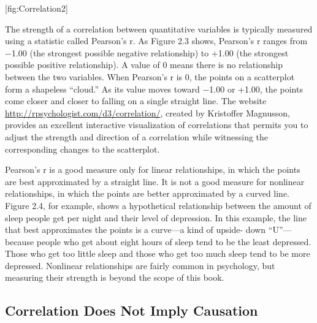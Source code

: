 \documentclass[]{book}
\theoremstyle{definition}
\theoremstyle{definition}
\theoremstyle{remark}
\begin{document}
{[}fig:Correlation2{]}

The strength of a correlation between quantitative variables is
typically measured using a statistic called Pearson's r. As Figure 2.3
shows, Pearson's r ranges from −1.00 (the strongest possible negative
relationship) to +1.00 (the strongest possible positive relationship). A
value of 0 means there is no relationship between the two variables.
When Pearson's r is 0, the points on a scatterplot form a shapeless
``cloud.'' As its value moves toward −1.00 or +1.00, the points come
closer and closer to falling on a single straight line. The website
\url{http://rpsychologist.com/d3/correlation/}, created by Kristoffer
Magnusson, provides an excellent interactive visualization of
correlations that permits you to adjust the strength and direction of a
correlation while witnessing the corresponding changes to the
scatterplot.

Pearson's r is a good measure only for linear relationships, in which
the points are best approximated by a straight line. It is not a good
measure for nonlinear relationships, in which the points are better
approximated by a curved line. Figure 2.4, for example, shows a
hypothetical relationship between the amount of sleep people get per
night and their level of depression. In this example, the line that best
approximates the points is a curve---a kind of upside- down
``U''---because people who get about eight hours of sleep tend to be the
least depressed. Those who get too little sleep and those who get too
much sleep tend to be more depressed. Nonlinear relationships are fairly
common in psychology, but measuring their strength is beyond the scope
of this book.

\subsection{Correlation Does Not Imply
Causation}\label{correlation-does-not-imply-causation}
\end{document}

